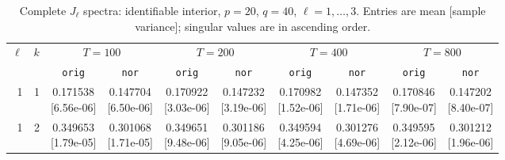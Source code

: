 \documentclass[12pt,letterpaper]{article}
\def\spacingset#1{\renewcommand{\baselinestretch}{#1}\small\normalsize}
\theoremstyle{plain}
\theoremstyle{definition}
\begin{document}
\begin{table}[p]
\begingroup
\spacingset{1.0}
\small\centering
\caption{Complete $J_\ell$ spectra: identifiable interior, $p=20$, $q=40$, $\ell=1,\ldots,3$. Entries are mean [sample variance]; singular values are in ascending order.}
\label{s23:lambda:alltab:spectra:p20q40interior:1-3}
\footnotesize
\setlength{\tabcolsep}{2.2pt}
\renewcommand{\arraystretch}{1.03}
\begin{adjustbox}{max width=\linewidth}
\begin{tabular}{@{}rr*{8}{c}@{}}
\toprule
$\ell$ & $k$ & \multicolumn{2}{c}{$T=100$} & \multicolumn{2}{c}{$T=200$} & \multicolumn{2}{c}{$T=400$} & \multicolumn{2}{c}{$T=800$}\\
\cmidrule(lr){3-4}\cmidrule(lr){5-6}\cmidrule(lr){7-8}\cmidrule(lr){9-10}
 &  & \texttt{orig} & \texttt{nor} & \texttt{orig} & \texttt{nor} & \texttt{orig} & \texttt{nor} & \texttt{orig} & \texttt{nor}\\
\midrule
1 & 1 & \shortstack{0.171538\\[-1pt]{\scriptsize[6.56e-06]}} & \shortstack{0.147704\\[-1pt]{\scriptsize[6.50e-06]}} & \shortstack{0.170922\\[-1pt]{\scriptsize[3.03e-06]}} & \shortstack{0.147232\\[-1pt]{\scriptsize[3.19e-06]}} & \shortstack{0.170982\\[-1pt]{\scriptsize[1.52e-06]}} & \shortstack{0.147352\\[-1pt]{\scriptsize[1.71e-06]}} & \shortstack{0.170846\\[-1pt]{\scriptsize[7.90e-07]}} & \shortstack{0.147202\\[-1pt]{\scriptsize[8.40e-07]}}\\
1 & 2 & \shortstack{0.349653\\[-1pt]{\scriptsize[1.79e-05]}} & \shortstack{0.301068\\[-1pt]{\scriptsize[1.71e-05]}} & \shortstack{0.349651\\[-1pt]{\scriptsize[9.48e-06]}} & \shortstack{0.301186\\[-1pt]{\scriptsize[9.05e-06]}} & \shortstack{0.349594\\[-1pt]{\scriptsize[4.25e-06]}} & \shortstack{0.301276\\[-1pt]{\scriptsize[4.69e-06]}} & \shortstack{0.349595\\[-1pt]{\scriptsize[2.12e-06]}} & \shortstack{0.301212\\[-1pt]{\scriptsize[1.96e-06]}}\\

\end{tabular}
\end{adjustbox}
\end{table}
\end{document}
